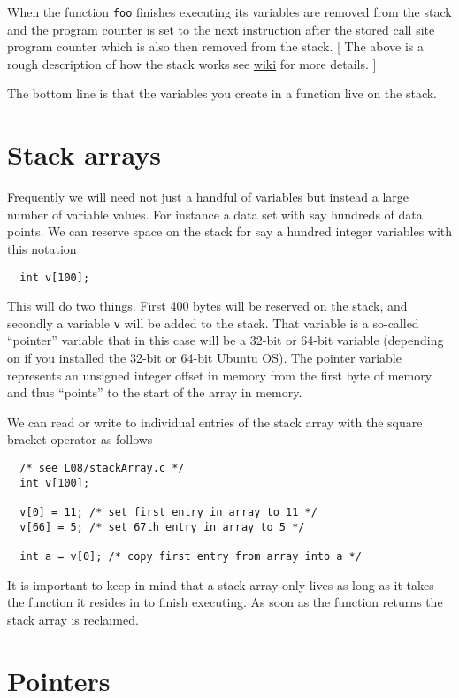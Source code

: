 When the function \texttt{foo} finishes executing its variables are removed from the stack and the program counter is set to the next instruction after the stored call site program counter which is also then removed from the stack. [ The above is a rough description of how the stack works see \href{https://en.wikipedia.org/wiki/Call_stack}{wiki} for more details. ]

The bottom line is that the variables you create in a function live on the stack. 

\section{Stack arrays}

Frequently we will need not just a handful of variables but instead a large  number of variable values. For instance a data set with say hundreds of data points. We can reserve space on the stack for say a hundred integer variables with this notation

\begin{verbatim}
  int v[100];
\end{verbatim}

This will do two things. First 400 bytes will be reserved on the stack, and secondly a variable \texttt{v} will be added to the stack. That variable is a so-called ``pointer'' variable that in this case will be a 32-bit or 64-bit variable (depending on if you installed the 32-bit or 64-bit Ubuntu OS). The pointer variable represents an unsigned integer offset in memory from the first byte of memory and thus ``points'' to the start of the array in memory.

We can read or write to individual entries of the stack array with the square bracket operator as follows

\begin{verbatim}
  /* see L08/stackArray.c */
  int v[100];
  
  v[0] = 11; /* set first entry in array to 11 */
  v[66] = 5; /* set 67th entry in array to 5 */
   
  int a = v[0]; /* copy first entry from array into a */ 
\end{verbatim}

It is important to keep in mind that a stack array only lives as long as it takes the function it resides in to finish executing. As soon as the function returns the stack array is reclaimed. 

\section{Pointers}


